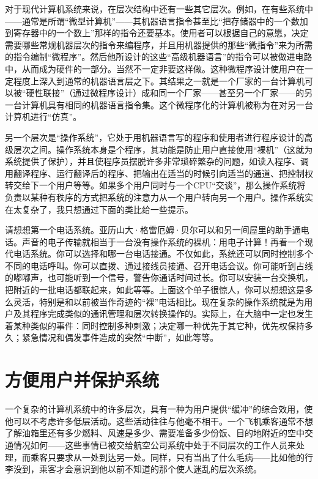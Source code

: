 对于现代计算机系统来说，在层次结构中还有一些其它层次。例如，在有些系统中——通常是所谓“微型计算机”——其机器语言指令甚至比“把存储器中的一个数加到寄存器中的一个数上”那样的指令还要基本。使用者可以根据自己的意愿，决定需要哪些常规机器层次的指令来编程序，并且用机器提供的那些“微指令”来为所需的指令编制“微程序”。然后他所设计的这些“高级机器语言”的指令可以被做进电路中，从而成为硬件的一部分。当然不一定非要这样做。这种微程序设计使用户在一定程度上深入到通常的机器语言层之下。其结果之一就是一个厂家的一台计算机可以被“硬性联接”（通过微程序设计）成和同一个厂家——甚至另一个厂家——的另一台计算机具有相同的机器语言指令集。这个微程序化的计算机被称为在对另一台计算机进行“仿真”。

另一个层次是“操作系统”，它处于用机器语言写的程序和使用者进行程序设计的高级层次之间。操作系统本身是个程序，其功能是防止用户直接使用“裸机”（这就为系统提供了保护），并且使程序员摆脱许多非常琐碎繁杂的问题，如读入程序、调用翻译程序、运行翻译后的程序、把输出在适当的时候引向适当的通道、把控制权转交给下一个用户等等。如果多个用户同时与一个CPU“交谈”，那么操作系统将负责以某种有秩序的方式把系统的注意力从一个用户转向另一个用户。操作系统实在太复杂了，我只想通过下面的类比给一些提示。

请想想第一个电话系统。亚历山大·格雷厄姆·贝尔可以和另一间屋里的助手通电话。声音的电子传输就相当于一台没有操作系统的裸机：用电子计算！再看一个现代电话系统。你可以选择和哪一台电话接通。不仅如此，系统还可以同时控制多个不同的电话呼叫。你可以直拨、通过接线员接通、召开电话会议。你可能听到占线的嘟嘟声，也可能听到一个信号，警告你通话时间过长。你可以安装一台交换机，把附近的一批电话都联起来，如此等等。上面这个单子很惊人，你可以想想这是多么灵活，特别是和以前被当作奇迹的“裸”电话相比。现在复杂的操作系统就是为用户及其程序完成类似的通讯管理和层次转换操作的。实际上，在大脑中一定也发生着某种类似的事件：同时控制多种刺激；决定哪一种优先于其它种，优先权保持多久；紧急情况和偶发事件造成的突然“中断”，如此等等。

\section{方便用户并保护系统}

一个复杂的计算机系统中的许多层次，具有一种为用户提供“缓冲”的综合效用，使他可以不考虑许多低层活动。这些活动往往与他毫不相干。一个飞机乘客通常不想了解油箱里还有多少燃料、风速是多少、需要准备多少份饭、目的地附近的空中交通情况如何——这些事情已被交给航空公司系统中处于不同层次的工作人员来处理，而乘客只要求从一处到达另一处。同样，只有当出了什么毛病——比如他的行李没到，乘客才会意识到他以前不知道的那个使人迷乱的层次系统。

